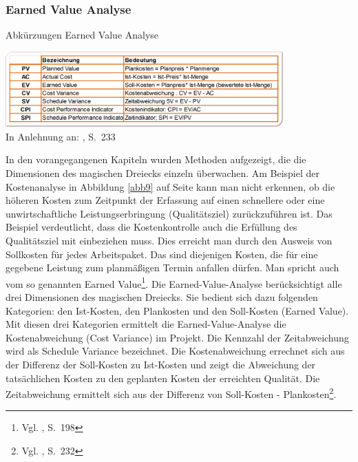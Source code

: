 \subsubsection{Earned Value Analyse}
\begin{table}[htbp]
\begin{center}
\caption[Abkürzungen Earned Value Analyse]{Abkürzungen Earned Value Analyse}\label{tbl3}
\includegraphics[width=0.8\textwidth]{Images/ev.png}\\{\footnotesize In Anlehnung an: \cite{Drews&Hillebrand2007}, S.~233}
\end{center}
\end{table}
In den vorangegangenen Kapiteln wurden Methoden aufgezeigt, die die Dimensionen des magischen Dreiecks einzeln überwachen. Am Beispiel der Kostenanalyse in Abbildung \ref{abb9} auf Seite \pageref{abb9} kann man nicht erkennen, ob die höheren Kosten zum Zeitpunkt der Erfassung auf einen schnellere oder eine unwirtschaftliche Leistungserbringung (Qualitätsziel) zurückzuführen ist. 
Das Beispiel verdeutlicht, dass die Kostenkontrolle auch die Erfüllung des Qualitätsziel mit einbeziehen muss. Dies erreicht man durch den Ausweis von Sollkosten für jedes Arbeitspaket. Das sind diejenigen Kosten, die für eine gegebene Leistung zum planmäßigen Termin anfallen dürfen. Man spricht auch vom so genannten Earned Value\footnote{Vgl. \cite{Fiedler2008}, S.~198}.
Die Earned-Value-Analyse berücksichtigt alle drei Dimensionen des magischen Dreiecks. Sie bedient sich dazu folgenden Kategorien: den Ist-Kosten, den Plankosten und den Soll-Kosten (Earned Value). Mit diesen drei Kategorien ermittelt die Earned-Value-Analyse die Kostenabweichung (Cost Variance) im Projekt. Die Kennzahl der Zeitabweichung wird als Schedule Variance bezeichnet. Die Kostenabweichung errechnet sich aus der Differenz der Soll-Kosten zu Ist-Kosten und zeigt die Abweichung der tatsächlichen Kosten zu den geplanten Kosten der erreichten Qualität. Die Zeitabweichung ermittelt sich aus der Differenz von Soll-Kosten - Plankosten\footnote{Vgl. \cite{Drews&Hillebrand2007}, S.~232}.
